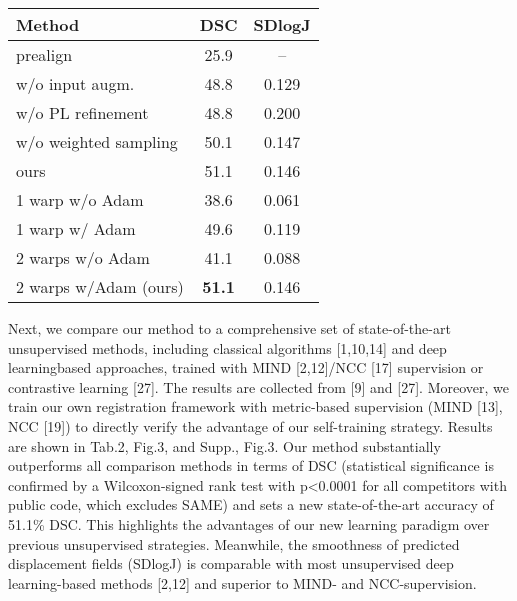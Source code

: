 \begin{table}
  \vspace{0.5em}\centering\wuhao
  \begin{tabular}{lcc}
    \toprule
    \textbf{Method}       & \textbf{DSC}  & \textbf{SDlogJ} \\
    \midrule
    prealign              & 25.9          & --              \\
    w/o input augm.       & 48.8          & 0.129           \\
    w/o PL refinement     & 48.8          & 0.200           \\
    w/o weighted sampling & 50.1          & 0.147           \\
    ours                  & 51.1          & 0.146           \\
    \midrule
    1 warp w/o Adam       & 38.6          & 0.061           \\
    1 warp w/ Adam        & 49.6          & 0.119           \\
    2 warps w/o Adam      & 41.1          & 0.088           \\
    2 warps w/Adam (ours) & \textbf{51.1} & 0.146           \\
    \bottomrule
  \end{tabular}
\end{table}

Next, we compare our method to a comprehensive set of state-of-the-art unsupervised methods, including classical algorithms [1,10,14] and deep learningbased approaches, trained with MIND [2,12]/NCC [17] supervision or contrastive learning [27]. The results are collected from [9] and [27]. Moreover, we train our own registration framework with metric-based supervision (MIND [13], NCC [19]) to directly verify the advantage of our self-training strategy. Results are shown in Tab.2, Fig.3, and Supp., Fig.3. Our method substantially outperforms all comparison methods in terms of DSC (statistical significance is confirmed by a Wilcoxon-signed rank test with p<0.0001 for all competitors with public code, which excludes SAME) and sets a new state-of-the-art accuracy of 51.1\% DSC. This highlights the advantages of our new learning paradigm over previous unsupervised strategies. Meanwhile, the smoothness of predicted displacement fields (SDlogJ) is comparable with most unsupervised deep learning-based methods [2,12] and superior to MIND- and NCC-supervision.

